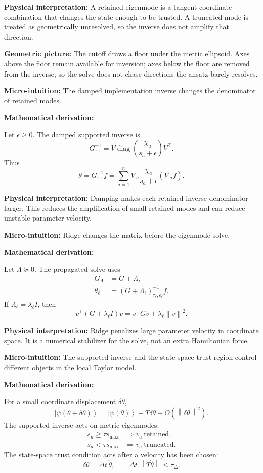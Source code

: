 \documentclass[10pt,twocolumn]{article}
\newcommand{\ket}[1]{\left|#1\right\rangle}
\newcommand{\norm}[1]{\left\lVert #1\right\rVert}
\newcommand{\diag}{\operatorname{diag}}
\newcommand{\Id}{I}
\newcommand{\micro}[1]{%
  \par\smallskip
  \noindent\textcolor{deepblue}{\textbf{Micro-intuition:}} #1
  \par\smallskip}
\newcommand{\deriv}{%
  \par\noindent\textcolor{deepviolet}{\textbf{Mathematical derivation:}}\par\vspace{-1mm}}
\newcommand{\phys}[1]{%
  \par\smallskip
  \noindent\textcolor{deepgreen}{\textbf{Physical interpretation:}} #1
  \par\smallskip}
\newcommand{\geom}[1]{%
  \par\smallskip
  \noindent\textcolor{deepviolet}{\textbf{Geometric picture:}} #1
  \par\smallskip}
\begin{document}
\phys{A retained eigenmode is a tangent-coordinate combination that changes the
state enough to be trusted. A truncated mode is treated as geometrically
unresolved, so the inverse does not amplify that direction.}

\geom{The cutoff draws a floor under the metric ellipsoid. Axes above the floor
remain available for inversion; axes below the floor are removed from the
inverse, so the solve does not chase directions the ansatz barely resolves.}

\micro{The damped implementation inverse changes the denominator of retained
modes.}

\deriv
Let \(\epsilon\ge0\). The damped supported inverse is
\[
G_{\tau,\epsilon}^{-1}
=
V\diag\left(\frac{\chi_a}{s_a+\epsilon}\right)V^\top.
\]
Thus
\[
\dot\theta
=G_{\tau,\epsilon}^{-1}f
=
\sum_{a=1}^{n}
V_{\cdot a}
\frac{\chi_a}{s_a+\epsilon}
(V_{\cdot a}^\top f).
\]

\phys{Damping makes each retained inverse denominator larger. This reduces the
amplification of small retained modes and can reduce unstable parameter
velocity.}

\micro{Ridge changes the matrix before the eigenmode solve.}

\deriv
Let \(\Lambda\succeq0\). The propagated solve uses
\[
\begin{aligned}
G_\Lambda&=G+\Lambda,\\
\dot\theta_\ell
&=(G+\Lambda_\ell)_{\tau_\ell,\epsilon_\ell}^{-1}f.
\end{aligned}
\]
If \(\Lambda_\ell=\lambda_\ell\Id\), then
\[
v^\top(G+\lambda_\ell\Id)v
=v^\top Gv+\lambda_\ell\norm v^2.
\]

\phys{Ridge penalizes large parameter velocity in coordinate space. It is a
numerical stabilizer for the solve, not an extra Hamiltonian force.}

\micro{The supported inverse and the state-space trust region control different
objects in the local Taylor model.}

\deriv
For a small coordinate displacement \(\delta\theta\),
\[
\ket{\psi(\theta+\delta\theta)}
=
\ket{\psi(\theta)}+T\delta\theta+O(\norm{\delta\theta}^2).
\]
The supported inverse acts on metric eigenmodes:
\[
\begin{aligned}
s_a\ge\tau s_{\max}
&\Longrightarrow
v_a\ \text{retained},\\
s_a<\tau s_{\max}
&\Longrightarrow
v_a\ \text{truncated}.
\end{aligned}
\]
The state-space trust condition acts after a velocity has been chosen:
\[
\delta\theta=\Delta t\,\dot\theta,
\qquad
\Delta t\,\norm{T\dot\theta}\le\tau_\Delta.
\]
\end{document}
